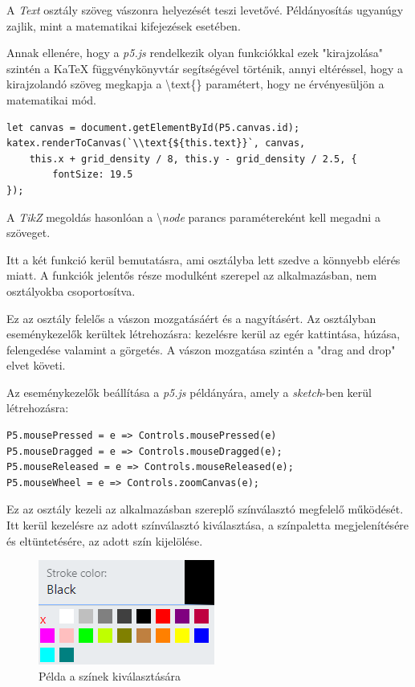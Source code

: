 
A \textit{Text} osztály szöveg vászonra helyezését teszi levetővé. Példányosítás ugyanúgy zajlik, mint a matematikai kifejezések esetében.

Annak ellenére, hogy a \textit{p5.js} rendelkezik olyan funkciókkal ezek "kirajzolása" szintén a KaTeX függvénykönyvtár segítségével történik, annyi eltéréssel, hogy a kirajzolandó szöveg megkapja a \textbackslash text\{\} paramétert, hogy ne érvényesüljön a matematikai mód.

\begin{lstlisting}[style=ES6]
let canvas = document.getElementById(P5.canvas.id);
katex.renderToCanvas(`\\text{${this.text}}`, canvas, 
    this.x + grid_density / 8, this.y - grid_density / 2.5, {
	    fontSize: 19.5
});
\end{lstlisting}

A \textit{TikZ} megoldás hasonlóan a \textbackslash \textit{node} parancs paramétereként kell megadni a szöveget.


Itt a két funkció kerül bemutatásra, ami osztályba lett szedve a könnyebb elérés miatt. A funkciók jelentős része modulként szerepel az alkalmazásban, nem osztályokba csoportosítva.


Ez az osztály felelős a vászon mozgatásáért és a nagyításért. Az osztályban eseménykezelők kerültek létrehozásra: kezelésre kerül az egér kattintása, húzása, felengedése valamint a görgetés. A vászon mozgatása szintén a "drag and drop" elvet követi.

Az eseménykezelők beállítása a \textit{p5.js} példányára, amely a \textit{sketch}-ben kerül létrehozásra:

\begin{lstlisting}[style=ES6]
P5.mousePressed = e => Controls.mousePressed(e)
P5.mouseDragged = e => Controls.mouseDragged(e);
P5.mouseReleased = e => Controls.mouseReleased(e);
P5.mouseWheel = e => Controls.zoomCanvas(e);
\end{lstlisting}


Ez az osztály kezeli az alkalmazásban szereplő színválasztó megfelelő működését. Itt kerül kezelésre az adott színválasztó kiválasztása, a színpaletta megjelenítésére és eltüntetésére, az adott szín kijelölése. 

\begin{figure}[!h]
	\centering
	\label{fig:cp2}
	\includegraphics[]{images/colorpicker.png}
	\caption{Példa a színek kiválasztására}
\end{figure}


